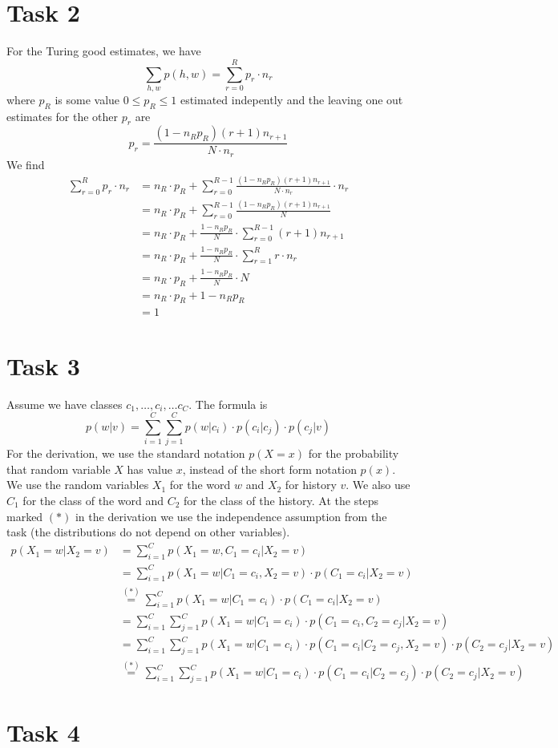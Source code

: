 \documentclass[%
   11pt,              %
   ngerman,           %
   a4paper,           %
   DIV11,             %
]{scrartcl}%
\begin{document}
\section*{Task 2}
For the Turing good estimates, we have
\begin{equation*}
	\sum_{h,w}p(h,w) = \sum_{r=0}^R p_r\cdot n_r
\end{equation*}
where $p_R$ is some value $0\leq p_R \leq 1$ estimated indepently and the leaving one out estimates for the other $p_r$ are
\begin{equation*}
	p_r = \frac{(1-n_R p_R) (r+1)n_{r+1}}{N\cdot n_r}
\end{equation*}
We find
\begin{align*}
	\sum_{r=0}^R p_r\cdot n_r &= n_R\cdot p_R + \sum_{r=0}^{R-1} \frac{(1-n_R p_R) (r+1)n_{r+1}}{N\cdot n_r} \cdot n_r \\
	&= n_R\cdot p_R + \sum_{r=0}^{R-1} \frac{(1-n_R p_R) (r+1)n_{r+1}}{N} \\
	&= n_R\cdot p_R + \frac{1-n_R p_R}{N} \cdot \sum_{r=0}^{R-1} (r+1)n_{r+1} \\
	&= n_R\cdot p_R + \frac{1-n_R p_R}{N} \cdot \sum_{r=1}^{R} r\cdot n_r \\
	&= n_R\cdot p_R + \frac{1-n_R p_R}{N} \cdot N \\
	&= n_R\cdot p_R + 1-n_R p_R\\
	&= 1
\end{align*}
\section*{Task 3}
Assume we have classes $c_1,\ldots,c_i,\ldots c_C$.
The formula is 
\begin{equation*}
	p(w|v) = \sum_{i=1}^C \sum_{j=1}^C p(w|c_i) \cdot p(c_i|c_j) \cdot p(c_j|v)
\end{equation*}
For the derivation, we use the standard notation $p(X=x)$ for the probability that random variable $X$ has value $x$, instead of the short form notation $p(x)$. We use the random variables $X_1$ for the word $w$ and $X_2$ for history $v$. We also use $C_1$ for the class of the word and $C_2$ for the class of the history. At the steps marked $(*)$ in the derivation we use the independence assumption from the task (the distributions do not depend on other variables).
\begin{align*}
	p(X_1 = w | X_2 = v) &= \sum_{i=1}^C p(X_1 = w, C_1 = c_i | X_2 = v) \\
	&= \sum_{i=1}^C p(X_1 = w|C_1 = c_i, X_2 = v) \cdot p(C_1 = c_i| X_2 = v) \\
	&\overset{(*)}{=} \sum_{i=1}^C p(X_1 = w|C_1 = c_i) \cdot p(C_1 = c_i| X_2 = v) \\
	&= \sum_{i=1}^C \sum_{j=1}^C p(X_1 = w|C_1 = c_i) \cdot p(C_1 = c_i, C_2 = c_j| X_2 = v) \\
	&= \sum_{i=1}^C \sum_{j=1}^C p(X_1 = w|C_1 = c_i) \cdot p(C_1 = c_i| C_2 = c_j, X_2 = v) \cdot p(C_2 = c_j | X_2 = v) \\
	&\overset{(*)}{=} \sum_{i=1}^C \sum_{j=1}^C p(X_1 = w|C_1 = c_i) \cdot p(C_1 = c_i| C_2 = c_j) \cdot p(C_2 = c_j | X_2 = v)
\end{align*}
\section*{Task 4}
\end{document}
